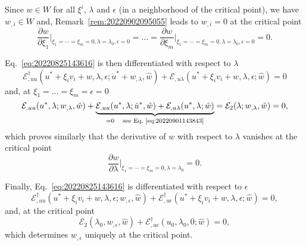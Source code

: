 \documentclass[12pt, final]{scrartcl}
\theoremstyle{definition}
\newcommand{\E}{\mathcal E}
\newcommand{\EE}{\mathcal E ^ \dagger}
\begin{document}
Since $w \in W$ for all $\xi^i$, $\lambda$ and \(\epsilon\) (in a neighborhood of the critical point), we have
$w_{,i} \in W$ and, Remark~\ref{rem:20220902095055} leads to $w_{,i} = 0$ at the critical point
\begin{equation}
  \frac{\partial w}{\partial\xi_1} \biggr\rvert_{\xi_1 = \cdots = \xi_m = 0, \lambda = \lambda_0, \epsilon = 0} = \ldots = \frac{\partial w}{\partial\xi_m} \biggr\rvert_{\xi_1 = \cdots = \xi_m = 0, \lambda = \lambda_0, \epsilon = 0} = 0.
\end{equation}

Eq.~\eqref{eq:20220825143616} is then differentiated with respect to $\lambda$
\begin{equation}
  \label{eq:20220830145945}
  \EE_{,uu}(u^\ast + \xi_i v_i + w, \lambda, \epsilon; \dot{u}^\ast + w_{,\lambda}, \hat{w}) + \E_{,u\lambda}(u^\ast + \xi_i v_i + w, \lambda, \epsilon; \hat{w}) = 0
\end{equation}
and, at $\xi_1 = \ldots = \xi_m = \epsilon = 0$
\begin{equation}
  \label{eq:20220830151513}
  \E_{,uu}(u^\ast, \lambda; w_{,\lambda}, \hat{w})
  + \underbrace{\E_{,uu}(u^\ast, \lambda; \dot{u}^\ast, \hat{w}) + \E_{,u\lambda}(u^\ast, \lambda; \hat{w})}_{=0 \quad \text{see Eq.~\eqref{eq:20220901143843}}}
  = \E_2(\lambda; w_{,\lambda}, \hat{w}) = 0,
\end{equation}
which proves similarly that the derivative of $w$ with respect to $\lambda$ vanishes at the critical point
\begin{equation}
  \frac{\partial w}{\partial\lambda} \biggr\rvert_{\xi_1 = \cdots = \xi_m = 0, \lambda = \lambda_0}= 0.
\end{equation}

Finally, Eq.~\eqref{eq:20220825143616} is differentiated with respect to $\epsilon$
\begin{equation}
  \label{eq:20221020142808}
  \EE_{,uu}(u^\ast + \xi_i v_i + w, \lambda, \epsilon; w_{,\epsilon}, \hat{w}) + \EE_{,u\epsilon}(u^\ast + \xi_i v_i + w, \lambda, \epsilon; \hat{w}) = 0,
\end{equation}
and, at the critical point
\begin{equation}
  \E_2(\lambda_0, w_{,\epsilon}, \hat{w}) + \EE_{,u\epsilon}(u_0, \lambda_0, 0; \hat{w}) = 0,
\end{equation}
which determines \(w_{,\epsilon}\) uniquely at the critical point.
\end{document}

